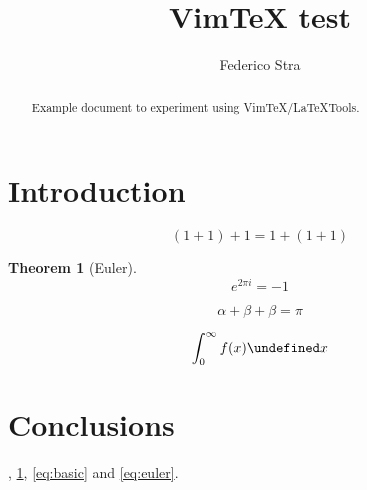 \documentclass[a4paper]{article}
\title{Vim\TeX{} test}
\author{Federico Stra}
\newtheorem{theorem}{Theorem}
\let\d\undefined
\newcommand{\d}{\mathop{}\!\mathrm{d}}
\begin{document}
\maketitle

\begin{abstract}
Example document to experiment using Vim\TeX{}/\LaTeX{}Tools.
\end{abstract}

\tableofcontents

\section{Introduction}\label{sec:intro}

\begin{equation}\label{eq:basic}
	(1+1) + 1 = 1 + (1+1) %
\end{equation}

\begin{theorem}[Euler]\label{thm:euler}
\begin{equation}\label{eq:euler}
	e^{2\pi i} = -1
\end{equation}
\end{theorem}

\begin{equation}
\alpha + \beta + \beta = \pi
\end{equation}

\[
	\int_0^\infty f(x) \d x
\]

\section{Conclusions}
, \cref{thm:euler}, \eqref{eq:basic} and \eqref{eq:euler}.
\end{document}

